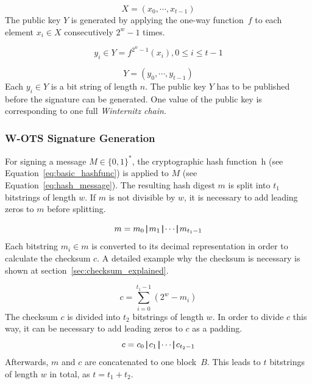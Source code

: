 \begin{equation}
\label{eq:wots_privkey}
X = (x_0, \cdots, x_{t-1})
\end{equation}
The public key $Y$ is generated by applying the one-way function~$f$ to each element $x_i  \in X$  consecutively $2^w - 1$ times. %

\begin{equation}
\label{eq:wots-generation-one-time-public-key}
y_i \in Y =  f^{2^w-1}(x_i), 0 \leq i \leq t-1 
\end{equation}

\begin{equation}
Y = (y_0, \cdots, y_{t-1})
\end{equation}
Each $y_i \in Y$ is a bit string of length $n$. The public key $Y$ has to be published before the signature can be generated. One value of the public key is corresponding to one full \textit{Winternitz chain}. %

\subsubsection{W-OTS Signature Generation}
For signing a message $M \in \lbrace 0,1 \rbrace^*$, the cryptographic hash function~h (see Equation~\ref{eq:basic_hashfunc}) is applied to $M$ (see Equation~\ref{eq:hash_message}). The resulting hash digest $m$ is split into $t_1$ bitstrings of length $w$. If $m$ is not divisible by $w$, it is necessary to add leading zeros to $m$ before splitting.

\begin{equation}
\label{eq:hash_digest_split}
m = m_0 \operatorname{|\!\!|} m_1 \operatorname{|\!\!|} \cdots \operatorname{|\!\!|} m_{t_1-1}
\end{equation}
Each bitstring $m_i \in m$ is converted to its decimal representation in order to calculate the checksum $c$. A detailed example why the checksum is necessary is shown at section~\ref{sec:checksum_explained}. %

\begin{equation}
\label{eq:checksum_calculation}
c = \sum_{i = 0}^{t_{1}-1}(2^w-m_i)
\end{equation}
The checksum $c$ is divided into $t_2$ bitstrings of length $w$. In order to divide $c$ this way, it can be necessary to add leading zeros to $c$ as a padding.
\begin{equation}
c = c_0 \operatorname{|\!\!|} c_1 \operatorname{|\!\!|} \cdots \operatorname{|\!\!|} c_{t_2 - 1}
\end{equation}
Afterwards, $m$ and $c$ are concatenated to one block~$B$. This leads to $t$ bitstrings of length $w$ in total, as $t = t_1 + t_2$.

